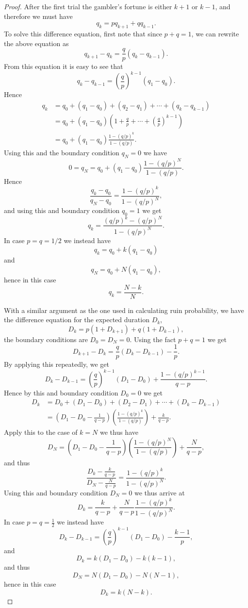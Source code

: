 \begin{proof}
After the first trial the gambler's fortune is either $k+1$ or $k-1$, and 
therefore we must have
\begin{equation}
  q_k = p q_{k+1} + q q_{k-1}.
\end{equation}
To solve this difference equation, first note that since $p+q=1$, we can 
rewrite the above equation as
\[
  q_{k+1} - q_k = \frac{q}{p} (q_k-q_{k-1}).
\]
From this equation it is easy to see that
\[
  q_k - q_{k-1} = \left( \frac{q}{p} \right)^{k-1} (q_1 - q_0).
\]
Hence
\begin{align*}
  q_k &= q_0 + (q_1-q_0) + (q_2-q_1) + \cdots + (q_k-q_{k-1})  \\
      &= q_0 
         + (q_1-q_0) \left( 1+\frac{q}{p} + \cdots + 
                           \left( \frac{q}{p} \right)^{k-1} \right) \\
      &= q_0 + (q_1-q_0) \frac{1-(q/p)^k}{1-(q/p)}.
\end{align*}
Using this and the boundary condition $q_N=0$ we have
\[
   0 = q_N = q_0 + (q_1-q_0) \frac{1-(q/p)^N}{1-(q/p)}.
\]
Hence 
\[
  \frac{q_k-q_0}{q_N-q_0} = \frac{1-(q/p)^k}{1-(q/p)^N},
\]
and using this and boundary condition $q_0=1$ we get
\[
  q_k = \frac{(q/p)^k - (q/p)^N}{1 - (q/p)^N}.
\]
In case $p=q=1/2$ we instead have
\[
  q_k = q_0 + k (q_1-q_0)
\]
and
\[
  q_N = q_0 + N (q_1-q_0),
\]
hence in this case
\[
  q_k = \frac{N-k}{N}.
\]

With a similar argument as the one used in calculating ruin probability, we have
the difference equation for the expected duration $D_k$,
\begin{equation}
  D_k = p(1+D_{k+1}) + q(1+D_{k-1}),
\end{equation}
the boundary conditions are $D_0=D_N=0$.
Using the fact $p+q=1$ we get
\[
  D_{k+1} - D_k = \frac{q}{p} (D_k-D_{k-1}) - \frac{1}{p}.
\]
By applying this repeatedly, we get
\[
  D_k - D_{k-1} = \left( \frac{q}{p} \right)^{k-1} (D_1-D_0) 
                  + \frac{1-(q/p)^{k-1}}{q-p}.
\]
Hence by this and boundary condition $D_0=0$ we get
\begin{align*}
  D_k &= D_0 + (D_1-D_0) + (D_2-D_1) + \cdots + (D_k-D_{k-1})  \\
      &= \left( D_1-D_0-\frac{1}{q-p} \right) 
         \left( \frac{1-(q/p)^k}{1-(q/p)}  \right) + \frac{k}{q-p}.
\end{align*}
Apply this to the case of $k=N$ we thus have
\[
   D_N = \left( D_1-D_0-\frac{1}{q-p} \right) 
         \left( \frac{1-(q/p)^N}{1-(q/p)}  \right) + \frac{N}{q-p},
\]
and thus
\[
  \frac{D_k-\frac{k}{q-p}}{D_N-\frac{N}{q-p}}
    = \frac{1-(q/p)^k}{1-(q/p)^N}.
\]
Using this and boundary condition $D_N=0$ we thus arrive at
\[
  D_k = \frac{k}{q-p} + \frac{N}{q-p} \frac{1-(q/p)^k}{1-(q/p)^N}.
\]
In case $p=q=\frac{1}{2}$ we instead have
\[
  D_k - D_{k-1} = \left( \frac{q}{p} \right)^{k-1} (D_1-D_0) - \frac{k-1}{p},
\]
and 
\[
  D_k = k(D_1-D_0) - k(k-1),
\]
and thus
\[
  D_N = N(D_1-D_0) - N(N-1),
\]
hence in this case
\[
  D_k = k(N-k).
\]
\end{proof}








